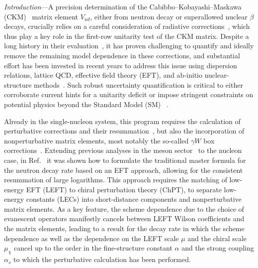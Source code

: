 \documentclass[prl,twocolumn,twoside,preprintnumbers,superscriptaddress,nofootinbib,letterpaper]{revtex4-1}
\begin{document}
\emph{Introduction}---A precision determination of the Cabibbo--Kobayashi--Maskawa (CKM)~\cite{Cabibbo:1963yz,Kobayashi:1973fv} matrix element $V_{ud}$, either from neutron decay or superallowed nuclear $\beta$ decays, crucially relies on a careful consideration of radiative corrections~\cite{Hardy:2020qwl}, which thus play a key role in the first-row unitarity test of the CKM matrix.
Despite a long history in their evaluation~\cite{Kinoshita:1958ru,Sirlin:1967zz,Sirlin:1967zza,Abers:1968zz,Jaus:1970tah,Sirlin:1977sv,Sirlin:1981ie,Wilkinson:1982hu,Sirlin:1986cc,Towner:1992xm,
Wilkinson:1993hxz,Wilkinson:1993fva,Czarnecki:2004cw,Marciano:2005ec,Towner:2010zz}, it has proven challenging to quantify and ideally remove the remaining model dependence in these corrections, and substantial effort has been invested in recent years to address this issue using dispersion relations, lattice QCD, effective field theory (EFT), and ab-initio nuclear-structure methods~\cite{Seng:2018yzq,Seng:2018qru,Gorchtein:2018fxl,Seng:2022cnq,Ma:2023kfr,Seng:2023cvt,Hill:2023acw,Cirigliano:2023fnz,Cirigliano:2024rfk,Cirigliano:2024msg,Borah:2024ghn,Gennari:2024sbn,VanderGriend:2025mdc,King:2025fph,Cao:2025zxs,Crosas:2025xyv,Gorbahn:2025ssv}. Such robust uncertainty quantification is critical to either corroborate current hints for a unitarity deficit or impose stringent constraints on potential physics beyond the Standard Model (SM)
~\cite{Belfatto:2019swo,Coutinho:2019aiy,Cheung:2020vqm,Belfatto:2021jhf,Branco:2021vhs,Crivellin:2021bkd,Crivellin:2020ebi,Kirk:2020wdk,Crivellin:2021njn,Crivellin:2020lzu,Crivellin:2020klg,Capdevila:2020rrl,Crivellin:2021sff,Crivellin:2020oup,Marzocca:2021azj,Alok:2021ydy, Cirigliano:2022qdm,Cirigliano:2023nol,Dawid:2024wmp}.

Already in the single-nucleon system, this program requires the calculation of perturbative corrections and their resummation~\cite{Cirigliano:2023fnz,VanderGriend:2025mdc,Gorbahn:2025ssv}, but also the incorporation of nonperturbative matrix elements, most notably the so-called $\gamma W$ box corrections~\cite{Marciano:2005ec,Seng:2018yzq,Seng:2018qru,Czarnecki:2019mwq,Seng:2020wjq,Hayen:2020cxh,Shiells:2020fqp,Cirigliano:2022yyo,Ma:2023kfr}. Extending previous analyses in the meson sector~\cite{Descotes-Genon:2005wrq} to the nucleon case, in Ref.~\cite{Cirigliano:2023fnz} it was shown how to formulate the traditional master formula for the neutron decay rate based on an EFT approach, allowing for the consistent resummation of large logarithms. This approach requires the matching of low-energy EFT (LEFT) to chiral perturbation theory (ChPT), to separate low-energy constants (LECs) into short-distance components and nonperturbative matrix elements. As a key feature, the scheme dependence due to the choice of evanescent operators manifestly cancels between LEFT Wilson coefficients and the matrix elements, leading to a result for the decay rate in which the scheme dependence as well as the dependence on the LEFT scale $\mu$ and the chiral scale $\mu_\chi$ cancel up to the order in the fine-structure constant $\alpha$ and the strong coupling $\alpha_s$  to which the perturbative calculation has been performed.
\end{document}
